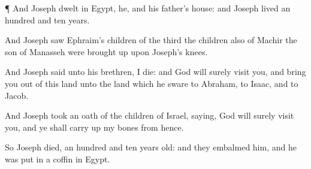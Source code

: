{\par }{\PP {}¶ And
Joseph
dwelt in
Egypt, he, and his
father’s
house: and
Joseph
lived an
hundred and
ten
years.

And
Joseph
saw
Ephraim’s
children of the
third
{} the
children also of
Machir the
son of
Manasseh were brought
up upon
Joseph’s
knees.

And
Joseph
said unto his
brethren, I
die: and
God will
surely
visit you, and bring you
out of this
land unto the
land which he
sware to
Abraham, to
Isaac, and to
Jacob.

And
Joseph took an
oath of the
children of
Israel,
saying,
God will
surely
visit you, and ye shall carry
up my
bones from
hence.

So
Joseph
died,
{} an
hundred and
ten
years
old: and they
embalmed him, and he was
put in a
coffin in
Egypt.


\par }